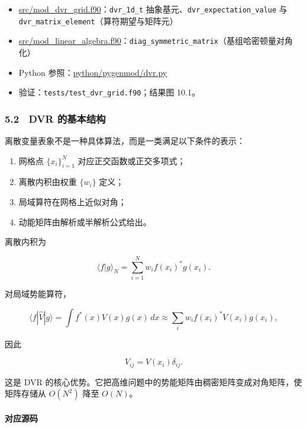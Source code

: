 \documentclass[
]{ctexbook}
\providecommand{\tightlist}{%
  \setlength{\itemsep}{0pt}\setlength{\parskip}{0pt}}
\begin{document}
\begin{itemize}
\tightlist
\item
  \href{https://github.com/l1Ha/QuantumGeneralModule/blob/main/src/mod_dvr_grid.f90}{src/mod\_dvr\_grid.f90}：\texttt{dvr\_1d\_t}
  抽象基元、\texttt{dvr\_expectation\_value} 与
  \texttt{dvr\_matrix\_element}（算符期望与矩阵元）
\item
  \href{https://github.com/l1Ha/QuantumGeneralModule/blob/main/src/mod_linear_algebra.f90}{src/mod\_linear\_algebra.f90}：\texttt{diag\_symmetric\_matrix}（基组哈密顿量对角化）
\item
  Python
  参照：\href{https://github.com/l1Ha/QuantumGeneralModule/blob/main/python/pygenmod/dvr.py}{python/pygenmod/dvr.py}
\item
  验证：\texttt{tests/test\_dvr\_grid.f90}；结果图 10.1。
\end{itemize}

\hypertarget{dvr-ux7684ux57faux672cux7ed3ux6784}{%
\subsubsection{5.2　DVR
的基本结构}\label{dvr-ux7684ux57faux672cux7ed3ux6784}}

离散变量表象不是一种具体算法，而是一类满足以下条件的表示：

\begin{enumerate}
\def\labelenumi{\arabic{enumi}.}
\tightlist
\item
  网格点 \(\{x_i\}_{i=1}^{N}\) 对应正交函数或正交多项式；
\item
  离散内积由权重 \(\{w_i\}\) 定义；
\item
  局域算符在网格上近似对角；
\item
  动能矩阵由解析或半解析公式给出。
\end{enumerate}

离散内积为

\[
\langle f|g\rangle_N
=
\sum_{i=1}^{N}w_i f(x_i)^{*}g(x_i).
\]

对局域势能算符，

\[
\langle f|\hat V|g\rangle
=
\int f^{*}(x)V(x)g(x)\,dx
\approx
\sum_i w_i f(x_i)^{*}V(x_i)g(x_i),
\]

因此

\[
V_{ij}=V(x_i)\delta_{ij}.
\]

这是 DVR
的核心优势。它把高维问题中的势能矩阵由稠密矩阵变成对角矩阵，使矩阵存储从
\(O(N^2)\) 降至 \(O(N)\)。

\hypertarget{ux5bf9ux5e94ux6e90ux7801-5}{%
\paragraph{对应源码}\label{ux5bf9ux5e94ux6e90ux7801-5}}
\end{document}
